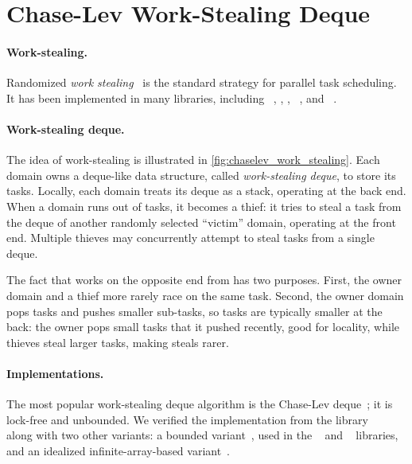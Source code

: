 

\section{Chase-Lev Work-Stealing Deque}
\label{sec:chaselev}



\paragraph{Work-stealing.}

Randomized \emph{work stealing}~\citep{DBLP:journals/jacm/BlumofeL99} is the standard strategy for parallel task scheduling.
It has been implemented in many libraries, including \Cilk~\citep{DBLP:journals/jpdc/BlumofeJKLRZ96,DBLP:conf/pldi/FrigoLR98}, \TBB, \OpenMP, \Taskflow~\citep{DBLP:journals/tpds/HuangLLL22}, \Tokio and \Domainslib~\citep{domainslib}.

\paragraph{Work-stealing deque.}

The idea of work-stealing is illustrated in \cref{fig:chaselev_work_stealing}. Each domain owns a deque-like data structure, called \emph{work-stealing deque}, to store its tasks.
Locally, each domain treats its deque as a stack, operating at the back end.
When a domain runs out of tasks, it becomes a thief: it tries to steal a task from the deque of another randomly selected ``victim'' domain, operating at the front end.
Multiple thieves may concurrently attempt to steal tasks from a single deque.

The fact that  works on the opposite end from  has two purposes. First, the owner domain and a thief more rarely race on the same task. Second, the owner domain pops tasks and pushes smaller sub-tasks, so tasks are typically smaller at the back: the owner pops small tasks that it pushed recently, good for locality, while thieves steal larger tasks, making steals rarer.

\paragraph{Implementations.}

The most popular work-stealing deque algorithm is the Chase-Lev deque~\citep{DBLP:conf/spaa/ChaseL05,DBLP:conf/ppopp/LePCN13}; it is lock-free and unbounded.
We verified the implementation from the \Saturn library~\citep{saturn}~ along with two other variants: a bounded variant~, used in the \Moonpool~\citep{moonpool} and \Taskflow~\citep{DBLP:journals/tpds/HuangLLL22} libraries, and an idealized infinite-array-based variant~.

